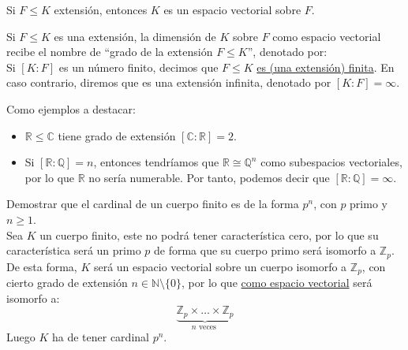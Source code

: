 \begin{observacion}
    Si $F\leq K$ extensión, entonces $K$ es un espacio vectorial sobre $F$.
\end{observacion}

\begin{definicion}
    Si $F\leq K$ es una extensión, la dimensión de $K$ sobre $F$ como espacio vectorial recibe el nombre de ``grado de la extensión $F\leq K$'', denotado por: 
    \begin{equation*}
        [K:F]
    \end{equation*}
    Si $[K:F]$ es un número finito, decimos que $F\leq K$ \underline{es (una extensión) finita}. En caso contrario, diremos que es una extensión infinita, denotado por $[K:F] = \infty$.
\end{definicion}

\begin{ejemplo}
    Como ejemplos a destacar:
    \begin{itemize}
        \item $\mathbb{R}\leq \mathbb{C}$ tiene grado de extensión $[\mathbb{C}:\mathbb{R}] = 2$.
        \item Si $[\mathbb{R}:\mathbb{Q}] = n$, entonces tendríamos que $\mathbb{R}\cong \mathbb{Q}^n$ como subespacios vectoriales, por lo que $\mathbb{R}$ no sería numerable. Por tanto, podemos decir que $[\mathbb{R}:\mathbb{Q}]=\infty$.
    \end{itemize}
\end{ejemplo}

\begin{ejercicio}\label{ej:cardinal_cuerpo}
    Demostrar que el cardinal de un cuerpo finito es de la forma $p^n$, con $p$ primo y $n\geq 1$.\\

    \noindent
    Sea $K$ un cuerpo finito, este no podrá tener característica cero, por lo que su característica será un primo $p$ de forma que su cuerpo primo será isomorfo a $\mathbb{Z}_p$. De esta forma, $K$ será un espacio vectorial sobre un cuerpo isomorfo a $\mathbb{Z}_p$, con cierto grado de extensión $n\in \mathbb{N}\setminus \{0\}$, por lo que \underline{como espacio vectorial} será isomorfo a:
    \begin{equation*}
        \underbrace{\mathbb{Z}_p\times \ldots \times \mathbb{Z}_p}_{n\text{ veces }}
    \end{equation*}
    Luego $K$ ha de tener cardinal $p^n$.
\end{ejercicio}

